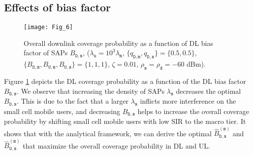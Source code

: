 \documentclass[twocolumn,english]{IEEEtran}
\theoremstyle{plain}
\theoremstyle{definition}
\begin{document}
\subsection{Effects of bias factor}

\begin{figure}[t]
\centering \texttt{[image: Fig\_6]}

\protect\caption{\label{fig:Cove-bias-fully-half}Overall downlink coverage probability
as a function of DL bias factor of SAPs $B_{\mathtt{D,s}}$, ($\lambda_{\mathtt{u}}=10^{3}\lambda_{\mathtt{m}}$,
$\{q_{\mathtt{D,m}},q_{\mathtt{D,s}}\}=\{0.5,0.5\}$, $\{B_{\mathtt{D,m}},B_{\mathtt{U,m}},B_{\mathtt{U,s}}\}=\{1,1,1\}$,
$\zeta=0.01$, $\rho_{\mathtt{s}}=\rho_{\mathtt{d}}=-60$ dBm).}
\end{figure}


Figure \ref{fig:Cove-bias-fully-half} depicts the DL coverage probability
as a function of the DL bias factor $B_{\mathtt{D,s}}$. We observe
that increasing the density of SAPs $\lambda_{\mathtt{s}}$ decreases
the optimal $B_{\mathtt{D,s}}$. This is due to the fact that a larger
$\lambda_{\mathtt{s}}$ inflicts more interference on the small cell
mobile users, and decreasing $B_{\mathtt{D,s}}$ helps to increase
the overall coverage probability by shifting small cell mobile users
with low SIR to the macro tier. It shows that with the analytical
framework, we can derive the optimal $\hat{B}_{\mathtt{D,s}}^{(\mathtt{m})}$
and $\hat{B}_{\mathtt{U,s}}^{(\mathtt{m})}$ that maximize the overall
coverage probability in DL and UL.
\end{document}
